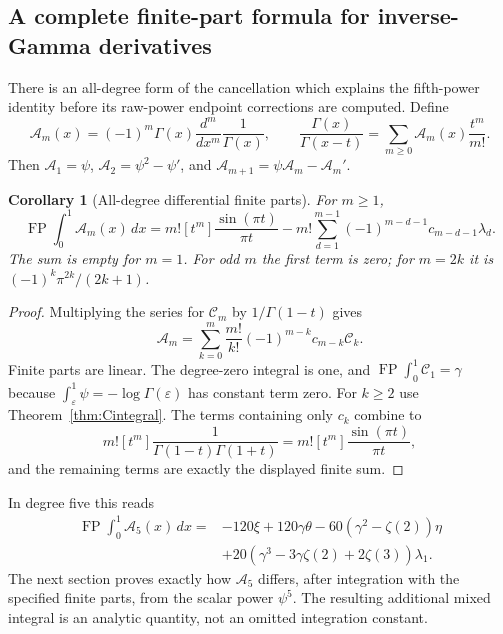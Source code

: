 \documentclass[11pt,a4paper]{article}
\numberwithin{equation}{section}
\newtheorem{corollary}[theorem]{Corollary}
\theoremstyle{definition}
\DeclareMathOperator{\FP}{FP}
\begin{document}
\subsection{A complete finite-part formula for inverse-Gamma derivatives}

There is an all-degree form of the cancellation which explains the
fifth-power identity before its raw-power endpoint corrections are
computed. Define
\begin{equation}\label{eq:Adefinition}
 \mathcal A_m(x)=(-1)^m\Gamma(x)\frac{d^m}{dx^m}\frac1{\Gamma(x)},
 \qquad
 \frac{\Gamma(x)}{\Gamma(x-t)}
       =\sum_{m\ge0}\mathcal A_m(x)\frac{t^m}{m!}.
\end{equation}
Then $\mathcal A_1=\psi$, $\mathcal A_2=\psi^2-\psi'$, and
$\mathcal A_{m+1}=\psi\mathcal A_m-\mathcal A_m'$.

\begin{corollary}[All-degree differential finite parts]
\label{cor:Aintegrals}
For $m\ge1$,
\begin{equation}\label{eq:Aintegrals}
 \boxed{\displaystyle
 \FP\int_0^1\mathcal A_m(x)\,dx
 =m![t^m]\frac{\sin(\pi t)}{\pi t}
   -m!\sum_{d=1}^{m-1}(-1)^{m-d-1}c_{m-d-1}\lambda_d.}
\end{equation}
The sum is empty for $m=1$. For odd $m$ the first term is zero;
for $m=2k$ it is $(-1)^k\pi^{2k}/(2k+1)$.
\end{corollary}
\begin{proof}
Multiplying the series for $\mathcal C_m$ by $1/\Gamma(1-t)$ gives
\[
 \mathcal A_m=\sum_{k=0}^m\frac{m!}{k!}
                         (-1)^{m-k}c_{m-k}\mathcal C_k.
\]
Finite parts are linear. The degree-zero integral is one, and
$\FP\int_0^1\mathcal C_1=\gamma$ because
$\int_\varepsilon^1\psi=-\log\Gamma(\varepsilon)$ has constant
term zero. For $k\ge2$ use Theorem~\ref{thm:Cintegral}.
The terms containing only $c_k$ combine to
\[
 m![t^m]\frac1{\Gamma(1-t)\Gamma(1+t)}
     =m![t^m]\frac{\sin(\pi t)}{\pi t},
\]
and the remaining terms are exactly the displayed finite sum.
\end{proof}

In degree five this reads
\begin{equation}\label{eq:A5height}
 \begin{aligned}
 \FP\int_0^1\mathcal A_5(x)\,dx
   ={}&-120\xi+120\gamma\theta
      -60(\gamma^2-\zeta(2))\eta\\
      &+20(\gamma^3-3\gamma\zeta(2)+2\zeta(3))\lambda_1.
 \end{aligned}
\end{equation}
The next section proves exactly how $\mathcal A_5$ differs, after
integration with the specified finite parts, from the scalar power
$\psi^5$. The resulting additional mixed integral is an analytic
quantity, not an omitted integration constant.
\end{document}
